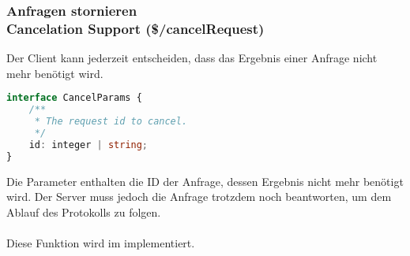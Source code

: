 \documentclass[./einleitung.tex]{subfiles}
\begin{document}
    \subsubsection[Anfragen stornieren]{Anfragen stornieren\\ {\textnormal{\footnotesize Cancelation Support (\$/cancelRequest) \cite{cancelation}}}} \label{subsubsec:cancel}
    Der Client kann jederzeit entscheiden, dass das Ergebnis einer Anfrage nicht mehr benötigt wird.
    \begin{lstlisting}[language=Typescript,title=Definition der Parameter \cite{cancelation},label={lst:cancelParams}]
interface CancelParams {
	/**
	 * The request id to cancel.
	 */
	id: integer | string;
}
    \end{lstlisting}
    Die Parameter enthalten die ID der Anfrage, dessen Ergebnis nicht mehr benötigt wird.
    Der Server muss jedoch die Anfrage trotzdem noch beantworten, um dem Ablauf des Protokolls zu folgen.
    \\\\
    Diese Funktion wird im  implementiert.
\end{document}
